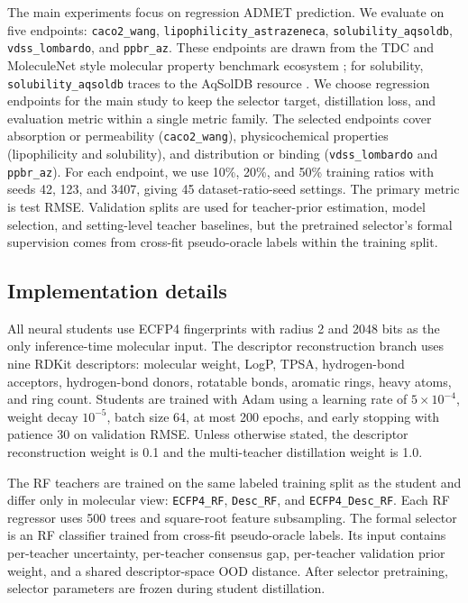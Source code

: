 \documentclass[11pt]{article}
\begin{document}
The main experiments focus on regression ADMET prediction. We evaluate on five
endpoints: \texttt{caco2\_wang}, \texttt{lipophilicity\_astrazeneca},
\texttt{solubility\_aqsoldb}, \texttt{vdss\_lombardo}, and
\texttt{ppbr\_az}. These endpoints are drawn from the TDC and MoleculeNet
style molecular property benchmark ecosystem \cite{Wu2018MoleculeNet,Huang2021TDC};
for solubility, \texttt{solubility\_aqsoldb} traces to the AqSolDB resource
\cite{Sorkun2019AqSolDB}. We choose regression endpoints for the main study to
keep the selector target, distillation loss, and evaluation metric within a
single metric family. The selected endpoints cover absorption or permeability
(\texttt{caco2\_wang}), physicochemical properties (lipophilicity and
solubility), and distribution or binding (\texttt{vdss\_lombardo} and
\texttt{ppbr\_az}).
For each endpoint, we use 10\%, 20\%, and 50\% training
ratios with seeds 42, 123, and 3407, giving 45 dataset-ratio-seed settings.
The primary metric is test RMSE. Validation splits are used for teacher-prior
estimation, model selection, and setting-level teacher baselines, but the
pretrained selector's formal supervision comes from cross-fit pseudo-oracle
labels within the training split.

\subsection{Implementation details}

All neural students use ECFP4 fingerprints with radius 2 and 2048 bits as the
only inference-time molecular input. The descriptor reconstruction branch uses
nine RDKit descriptors: molecular weight, LogP, TPSA, hydrogen-bond acceptors,
hydrogen-bond donors, rotatable bonds, aromatic rings, heavy atoms, and ring
count. Students are trained with Adam using a learning rate of \(5\times
10^{-4}\), weight decay \(10^{-5}\), batch size 64, at most 200 epochs, and
early stopping with patience 30 on validation RMSE. Unless otherwise stated,
the descriptor reconstruction weight is 0.1 and the multi-teacher distillation
weight is 1.0.

The RF teachers are trained on the same labeled training split as the student
and differ only in molecular view: \texttt{ECFP4\_RF}, \texttt{Desc\_RF}, and
\texttt{ECFP4\_Desc\_RF}. Each RF regressor uses 500 trees and square-root
feature subsampling. The formal selector is an RF classifier trained from
cross-fit pseudo-oracle labels. Its input contains per-teacher uncertainty,
per-teacher consensus gap, per-teacher validation prior weight, and a shared
descriptor-space OOD distance. After selector pretraining, selector parameters
are frozen during student distillation.
\end{document}
